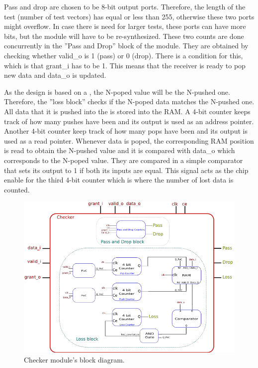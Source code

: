 \documentclass[12pt]{article}
\begin{document}
Pass and drop are chosen to be 8-bit output ports.  Therefore, the length of the test (number of test vectors) has equal or less than 255, otherwise these two ports might overflow.  In case there is need for larger tests, these ports can have more bits, but the module will have to be re-synthesized.  These two counts are done concurrently in the ''Pass and Drop'' block of the module.  They are obtained by checking whether valid\_o is 1 (pass) or 0 (drop).  There is a condition for this, which is that grant\_i has to be 1.  This means that the receiver is ready to pop new data and data\_o is updated.

As the design is based on a \fifo, the N-poped value will be the N-pushed one.  Therefore, the ''loss block'' checks if the N-poped data matches the N-pushed one.  All data that it is pushed into the \fifo is stored into the RAM.  A 4-bit counter keeps track of how many pushes have been and its output is used as an address pointer.  Another 4-bit counter keep track of how many pops have been and its output is used as a read pointer.  Whenever data is poped, the corresponding RAM position is read to obtain the N-pushed value and it is compared with data\_o which corresponds to the N-poped value.  They are compared in a simple comparator that sets its output to 1 if both its inputs are equal.  This signal acts as the chip enable for the third 4-bit counter which is where the number of lost data is counted.

\begin{figure}[ht]
\centering
\includegraphics[width=15cm]{images/checker_diagram}
\caption{\label{fig:Checker diagram}Checker module's block diagram.}
\end{figure}
\end{document}
